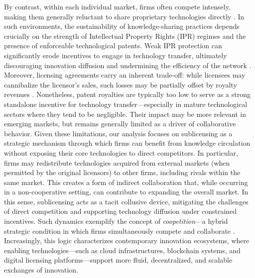 \documentclass[preprint,11pt,authoryear]{elsarticle}
\theoremstyle{plain}
\begin{document}
By contrast, within each individual market, firms often compete intensely, making them generally reluctant to share proprietary technologies directly \citep{fosfuri2006licensing}. In such environments, the sustainability of knowledge-sharing practices depends crucially on the strength of Intellectual Property Rights (IPR) regimes and the presence of enforceable technological patents. Weak IPR protection can significantly erode incentives to engage in technology transfer, ultimately discouraging innovation diffusion and undermining the efficiency of the network \citep{arora2006patent}. Moreover, licensing agreements carry an inherent trade-off: while licensees may cannibalize the licensor’s sales, such losses may be partially offset by royalty revenues \citep{fosfuri2006licensing}. Nonetheless, patent royalties are typically too low to serve as a strong standalone incentive for technology transfer—especially in mature technological sectors where they tend to be negligible. Their impact may be more relevant in emerging markets, but remains generally limited as a driver of collaborative behavior.
Given these limitations, our analysis focuses on sublicensing as a strategic mechanism through which firms can benefit from knowledge circulation without exposing their core technologies to direct competitors. In particular, firms may redistribute technologies acquired from external markets (when permitted by the original licensors) to other firms, including rivals within the same market. This creates a form of indirect collaboration that, while occurring in a non-cooperative setting, can contribute to expanding the overall market. In this sense, sublicensing acts as a tacit collusive device, mitigating the challenges of direct competition and supporting technology diffusion under constrained incentives. Such dynamics exemplify the concept of \textit{coopetition}—a hybrid strategic condition in which firms simultaneously compete and collaborate \citep{brandenburger2011co}. Increasingly, this logic characterizes contemporary innovation ecosystems, where enabling technologies—such as cloud infrastructures, blockchain systems, and digital licensing platforms—support more fluid, decentralized, and scalable exchanges of innovation.
\end{document}
